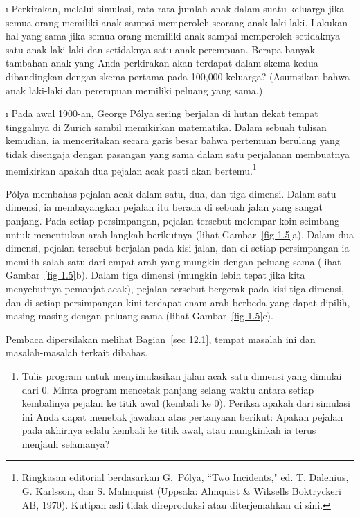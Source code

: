 \begin{LJSItem}
\i\label{1.1.16} Perkirakan, melalui simulasi, rata-rata jumlah anak
dalam suatu keluarga 
jika semua orang memiliki anak sampai memperoleh seorang anak laki-laki.  Lakukan hal yang sama
jika semua
orang memiliki anak sampai memperoleh setidaknya satu anak laki-laki dan setidaknya satu anak perempuan. 
Berapa
banyak tambahan anak yang Anda perkirakan akan terdapat dalam skema kedua dibandingkan
dengan skema pertama pada 100{,}000 keluarga?  (Asumsikan bahwa anak laki-laki dan perempuan
memiliki peluang yang
sama.)


\i\label{exer 1.1.17} Pada awal 1900-an, George
P\'olya sering berjalan di hutan dekat tempat tinggalnya di
Zurich sambil memikirkan matematika. Dalam sebuah tulisan kemudian, ia
menceritakan secara garis besar bahwa pertemuan berulang yang tidak disengaja
dengan pasangan yang sama dalam satu perjalanan membuatnya memikirkan apakah
dua pejalan acak pasti akan bertemu.\footnote{Ringkasan editorial berdasarkan
G.~P\'olya, ``Two Incidents,"  ed. T. Dalenius, G. Karlsson, dan S. Malmquist (Uppsala:
Almquist \& Wiksells Boktryckeri AB, 1970). Kutipan asli tidak direproduksi
atau diterjemahkan di sini.}
\par
P\'olya membahas pejalan acak dalam satu, dua, dan tiga dimensi.  Dalam satu dimensi, ia membayangkan pejalan itu berada di sebuah jalan yang sangat panjang.  Pada setiap
persimpangan, pejalan tersebut melempar koin seimbang untuk menentukan arah langkah
berikutnya (lihat Gambar~\ref {fig 1.5}a).  Dalam dua dimensi, pejalan tersebut berjalan
pada kisi jalan, dan di setiap persimpangan ia memilih salah satu dari empat
arah yang mungkin dengan peluang sama (lihat Gambar~\ref {fig 1.5}b).  Dalam
tiga dimensi (mungkin lebih tepat jika kita menyebutnya pemanjat acak), pejalan tersebut
bergerak pada kisi tiga dimensi, dan di setiap persimpangan kini terdapat enam
arah berbeda yang dapat dipilih, masing-masing dengan peluang sama
(lihat Gambar~\ref {fig 1.5}c).
\par
Pembaca dipersilakan melihat Bagian~\ref{sec 12.1}, tempat masalah ini dan masalah-masalah terkait 
dibahas.

\begin{enumerate}

\item Tulis program untuk menyimulasikan jalan acak satu dimensi yang dimulai dari
0.  Minta program mencetak panjang selang waktu antara setiap kembalinya pejalan ke
titik
awal (kembali ke 0).  Periksa apakah dari simulasi ini Anda dapat menebak
jawaban atas pertanyaan berikut: Apakah pejalan pada akhirnya selalu kembali ke
titik
awal, atau mungkinkah ia terus menjauh selamanya?


\end{enumerate}
\end{LJSItem}
